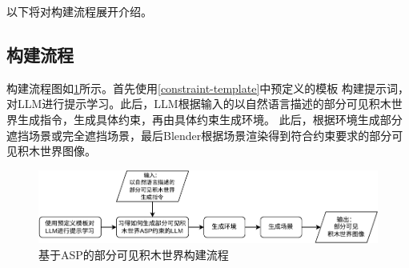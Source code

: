 以下将对构建流程展开介绍。
\subsection{构建流程}
构建流程图如\ref{fig:asp-based-block-world-construction}所示。首先使用\ref{constraint-template}中预定义的模板
构建提示词，对LLM进行提示学习。此后，LLM根据输入的以自然语言描述的部分可见积木世界生成指令，生成具体约束，再由具体约束生成环境。
此后，根据环境生成部分遮挡场景或完全遮挡场景，最后Blender根据场景渲染得到符合约束要求的部分可见积木世界图像。
\begin{figure}[h]
\centering
\includegraphics{figures/asp-based-block-world-construction-crop.pdf}
\caption{基于ASP的部分可见积木世界构建流程}
\label{fig:asp-based-block-world-construction}
\end{figure}
